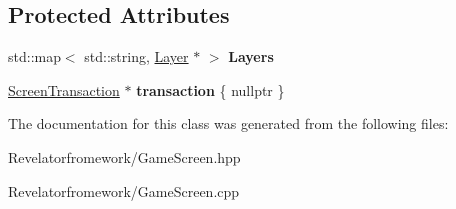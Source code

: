 \subsection*{Protected Attributes}
\begin{DoxyCompactItemize}
\item 
\hypertarget{class_game_screen_ab134d175092c247558838f11d66e9493}{std\-::map$<$ std\-::string, \hyperlink{class_layer}{Layer} $\ast$ $>$ {\bfseries Layers}}\label{class_game_screen_ab134d175092c247558838f11d66e9493}

\item 
\hypertarget{class_game_screen_accd7b1f865eb3e0ab95ca4eb8b795b93}{\hyperlink{class_screen_transaction}{Screen\-Transaction} $\ast$ {\bfseries transaction} \{ nullptr \}}\label{class_game_screen_accd7b1f865eb3e0ab95ca4eb8b795b93}

\end{DoxyCompactItemize}


The documentation for this class was generated from the following files\-:\begin{DoxyCompactItemize}
\item 
Revelatorfromework/Game\-Screen.\-hpp\item 
Revelatorfromework/Game\-Screen.\-cpp\end{DoxyCompactItemize}
